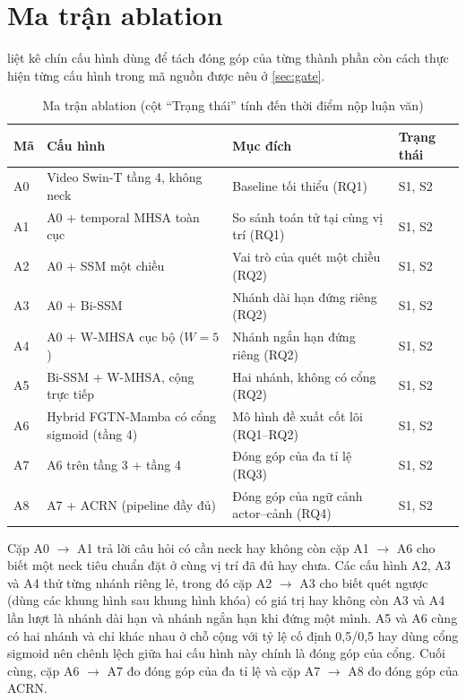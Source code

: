 \section{Ma trận ablation}
\label{sec:ablation}

 liệt kê chín cấu hình dùng để tách đóng góp của từng thành phần còn cách thực hiện từng cấu hình trong mã nguồn được nêu ở \cref{sec:gate}.

\begin{table}[htbp]
\centering
\caption{Ma trận ablation (cột ``Trạng thái'' tính đến thời điểm nộp luận văn)}
\label{tab:ablation}
\small
\begin{tabularx}{\textwidth}{lXXl}
\toprule
\textbf{Mã} & \textbf{Cấu hình} & \textbf{Mục đích} & \textbf{Trạng thái}\\
\midrule
A0 & Video Swin-T tầng 4, không neck & Baseline tối thiểu (RQ1) & S1, S2\\
A1 & A0 + temporal MHSA toàn cục & So sánh toán tử tại cùng vị trí (RQ1) & S1, S2\\
A2 & A0 + SSM một chiều & Vai trò của quét một chiều (RQ2) & S1, S2\\
A3 & A0 + Bi-SSM & Nhánh dài hạn đứng riêng (RQ2) & S1, S2\\
A4 & A0 + W-MHSA cục bộ ($W = 5$) & Nhánh ngắn hạn đứng riêng (RQ2) & S1, S2\\
A5 & Bi-SSM + W-MHSA, cộng trực tiếp & Hai nhánh, không có cổng (RQ2) & S1, S2\\
A6 & Hybrid FGTN-Mamba có cổng sigmoid (tầng 4) & Mô hình đề xuất cốt lõi (RQ1--RQ2) & S1, S2\\
A7 & A6 trên tầng 3 + tầng 4 & Đóng góp của đa tỉ lệ (RQ3) & S1, S2\\
A8 & A7 + ACRN (pipeline đầy đủ) & Đóng góp của ngữ cảnh actor--cảnh (RQ4) & S1, S2\\
\bottomrule
\end{tabularx}
\end{table}

Cặp A0 $\rightarrow$ A1 trả lời câu hỏi có cần neck hay không còn cặp A1 $\rightarrow$ A6 cho biết một neck tiêu chuẩn đặt ở cùng vị trí đã đủ hay chưa. Các cấu hình A2, A3 và A4 thử từng nhánh riêng lẻ, trong đó cặp A2 $\rightarrow$ A3 cho biết quét ngược (dùng các khung hình sau khung hình khóa) có giá trị hay không còn A3 và A4 lần lượt là nhánh dài hạn và nhánh ngắn hạn khi đứng một mình. A5 và A6 cùng có hai nhánh và chỉ khác nhau ở chỗ cộng với tỷ lệ cố định 0,5/0,5 hay dùng cổng sigmoid nên chênh lệch giữa hai cấu hình này chính là đóng góp của cổng. Cuối cùng, cặp A6 $\rightarrow$ A7 đo đóng góp của đa tỉ lệ và cặp A7 $\rightarrow$ A8 đo đóng góp của ACRN.

